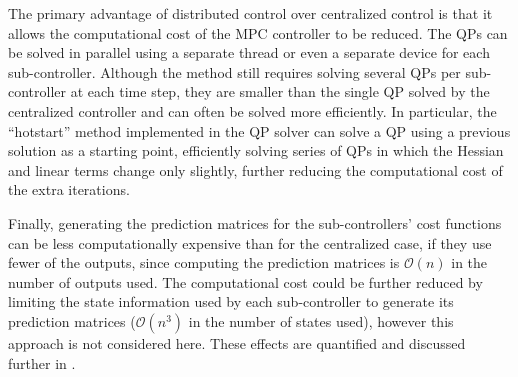 The primary advantage of distributed control over centralized control is that it allows the computational cost of the MPC controller to be reduced.
The QPs can be solved in parallel using a separate thread or even a separate device for each sub-controller.
Although the method still requires solving several QPs per sub-controller at each time step, they are smaller than the single QP solved by the centralized controller and can often be solved more efficiently.
In particular, the ``hotstart'' method implemented in the \qpoases{} QP solver can solve a QP using a previous solution as a starting point, efficiently solving series of QPs in which the Hessian and linear terms change only slightly, further reducing the computational cost of the extra iterations.

Finally, generating the prediction matrices for the sub-controllers' cost functions can be less computationally expensive than for the centralized case, if they use fewer of the outputs, since computing the prediction matrices is $\mathcal{O}(n)$ in the number of outputs used.
The computational cost could be further reduced by limiting the state information used by each sub-controller to generate its prediction matrices ($\mathcal{O}(n^3)$ in the number of states used), however this approach is not considered here.
These effects are quantified and discussed further in .

